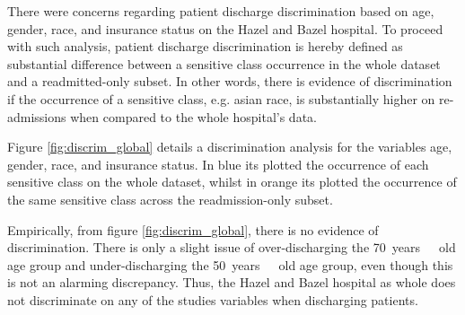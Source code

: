 \documentclass[a4paper,11pt]{article}
\begin{document}

There were concerns regarding patient discharge discrimination based on age, gender, race, and insurance status on the Hazel and Bazel hospital. To proceed with such analysis,  patient discharge discrimination is hereby defined as substantial difference between a sensitive class occurrence in the whole dataset and a readmitted-only subset.
In other words, there is evidence of discrimination if the occurrence of a sensitive class, e.g. asian race, is substantially higher on re-admissions when compared to the whole hospital's data.

Figure \ref{fig:discrim_global} details a discrimination analysis for the variables age, gender, race, and insurance status. In blue its plotted the occurrence of each sensitive class on the whole dataset, whilst in orange its plotted the occurrence of the same sensitive class across the readmission-only subset.

Empirically, from figure \ref{fig:discrim_global}, there is no evidence of discrimination. There is only a slight issue of over-discharging the \SI{70}{years\ old} age group and under-discharging the \SI{50}{years\ old} age group, even though this is not an alarming discrepancy.
Thus, the Hazel and Bazel hospital as whole does not discriminate on any of the studies variables when discharging patients.
\end{document}
